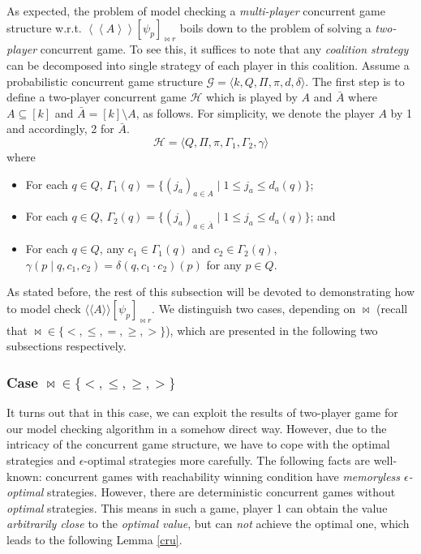 \documentclass[times, 10 pt,twocolumn]{article}
\newcommand{\mc}[1]{\mathcal{#1}}
\newcommand{\la}{\langle}
\newcommand{\ra}{\rangle}
\newcommand{\lla}{\langle\langle}
\newcommand{\rra}{\rangle\rangle}
\begin{document}
\vspace{2mm}

As expected, the problem of model checking a \emph{multi-player}
concurrent game structure w.r.t. $\left\langle {\left\langle A
\right\rangle } \right\rangle[\psi_p]_{\bowtie r}$ boils down to
the problem of solving a \emph{two-player} concurrent game. To see
this, it suffices to note that any \emph{coalition strategy} can
be decomposed into single strategy of each player in this
coalition. Assume a probabilistic concurrent game structure
$\mc{G}=\langle k, Q, \Pi, \pi, d, \delta\rangle$. The first step
is to define a two-player concurrent game $\mc{H}$ which is played
by $A$ and $\bar{A}$ where $A\subseteq [k]$ and
$\bar{A}=[k]\setminus A$, as
follows. For simplicity, we denote the player $A$ by 1 %
and accordingly, 2 for $\bar{A}$.
%
%
\[\mc{H}=\la Q, \Pi, \pi, \Gamma_1, \Gamma_2, \gamma\ra\]
where
\begin{itemize}

  \item For each $q\in Q$, $\Gamma_1(q)=\{(j_a)_{a\in A}\mid 1\leq j_a\leq d_a(q)\}$;

  \item For each $q\in Q$, $\Gamma_2(q)=\{(j_a)_{a\in \bar{A}}\mid 1\leq j_a\leq
  d_a(q)\}$; and

  \item For each $q\in Q$, any $c_1\in \Gamma_1(q)$ and $c_2\in
  \Gamma_2(q)$, $\gamma(p\mid q, c_1, c_2)=\delta(q,
  c_1\cdot  c_2)(p)$ for any $p\in Q$.
\end{itemize}

As stated before, the rest of this subsection will be devoted to
demonstrating how to model check $\lla A \rra[\psi_p]_{\bowtie
r}$. We distinguish two cases, depending on $\bowtie$ (recall that
$\bowtie \in \{<,\leq, =, \geq, >\}$), which are presented in the
following two subsections respectively.

\subsubsection{Case $\bowtie \in \{<,\leq,
\geq, >\}$} \label{nonequal}

It turns out that in this case, we can exploit the results of
two-player game for our model checking algorithm in a somehow
direct way. However, due to the intricacy of the concurrent game
structure, we have to cope with the optimal strategies and
$\epsilon$-optimal strategies more carefully. %
The following facts are well-known: concurrent games with
reachability winning condition have \emph{memoryless
$\epsilon$-optimal} strategies. However, there are deterministic
concurrent games without \emph{optimal} strategies. This means in
such a game, player 1 can obtain the value \emph{arbitrarily
close} to the \emph{optimal value}, but can \emph{not} achieve the
optimal one, which leads to the following Lemma \ref{cru}.
\end{document}
